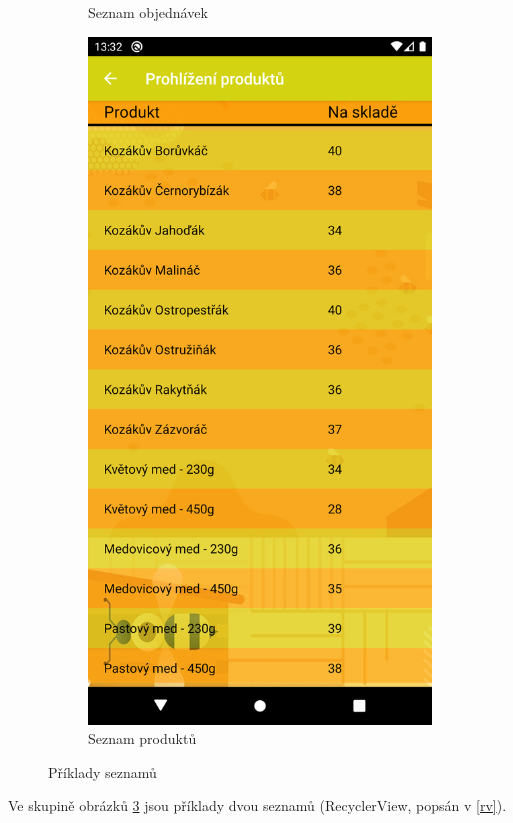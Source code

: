 \documentclass[12pt]{report}
\begin{document}
\begin{figure}[H]
\begin{subfigure}{.45\textwidth}
	  \caption{Seznam objednávek}
	  \label{fig:order_list_img}
	\end{subfigure}
	\begin{subfigure}{.45\textwidth}
	  \centering
	  \includegraphics[width=\textwidth]{img/product_list.png}
	  \caption{Seznam produktů}
	  \label{fig:product_list_img}
	\end{subfigure}
	\caption{Příklady seznamů}
	\label{fig:list_cont}
\end{figure}
%
Ve skupině obrázků \ref{fig:list_cont} jsou příklady dvou seznamů (RecyclerView, popsán v \ref{rv}).
\end{document}
